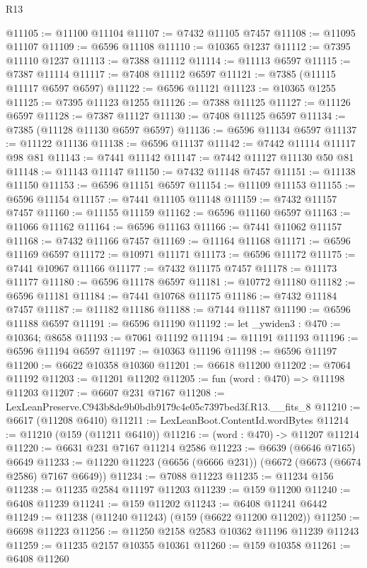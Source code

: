 \begin{lexlean}{R13}
\begin{coremodule}
@11105 := @11100 @11104
@11107 := @7432 @11105 @7457
@11108 := @11095 @11107
@11109 := @6596 @11108
@11110 := @10365 @1237
@11112 := @7395 @11110 @1237
@11113 := @7388 @11112
@11114 := @11113 @6597
@11115 := @7387 @11114
@11117 := @7408 @11112 @6597
@11121 := @7385 (@11115 @11117 @6597 @6597)
@11122 := @6596 @11121
@11123 := @10365 @1255
@11125 := @7395 @11123 @1255
@11126 := @7388 @11125
@11127 := @11126 @6597
@11128 := @7387 @11127
@11130 := @7408 @11125 @6597
@11134 := @7385 (@11128 @11130 @6597 @6597)
@11136 := @6596 @11134 @6597
@11137 := @11122 @11136
@11138 := @6596 @11137
@11142 := @7442 @11114 @11117 @98 @81
@11143 := @7441 @11142
@11147 := @7442 @11127 @11130 @50 @81
@11148 := @11143 @11147
@11150 := @7432 @11148 @7457
@11151 := @11138 @11150
@11153 := @6596 @11151 @6597
@11154 := @11109 @11153
@11155 := @6596 @11154
@11157 := @7441 @11105 @11148
@11159 := @7432 @11157 @7457
@11160 := @11155 @11159
@11162 := @6596 @11160 @6597
@11163 := @11066 @11162
@11164 := @6596 @11163
@11166 := @7441 @11062 @11157
@11168 := @7432 @11166 @7457
@11169 := @11164 @11168
@11171 := @6596 @11169 @6597
@11172 := @10971 @11171
@11173 := @6596 @11172
@11175 := @7441 @10967 @11166
@11177 := @7432 @11175 @7457
@11178 := @11173 @11177
@11180 := @6596 @11178 @6597
@11181 := @10772 @11180
@11182 := @6596 @11181
@11184 := @7441 @10768 @11175
@11186 := @7432 @11184 @7457
@11187 := @11182 @11186
@11188 := @7144 @11187
@11190 := @6596 @11188 @6597
@11191 := @6596 @11190
@11192 := let _ywiden3 : @470 := @10364; @8658
@11193 := @7061 @11192
@11194 := @11191 @11193
@11196 := @6596 @11194 @6597
@11197 := @10363 @11196
@11198 := @6596 @11197
@11200 := @6622 @10358 @10360
@11201 := @6618 @11200
@11202 := @7064 @11192
@11203 := @11201 @11202
@11205 := fun (word : @470) => @11198 @11203
@11207 := @6607 @231 @7167
@11208 := LexLeanPreserve.C943b8de9b0bdb9179c4e05c7397bed3f.R13.__fits_8
@11210 := @6617 (@11208 @6410)
@11211 := LexLeanBoot.ContentId.wordBytes
@11214 := @11210 (@159 (@11211 @6410))
@11216 := (word : @470) -> @11207 @11214
@11220 := @6631 @231 @7167 @11214 @2586
@11223 := @6639 (@6646 @7165) @6649
@11233 := @11220 @11223 (@6656 (@6666 @231)) (@6672 (@6673 (@6674 @2586) @7167 @6649))
@11234 := @7088 @11223
@11235 := @11234 @156
@11238 := @11235 @2584 @11197 @11203
@11239 := @159 @11200
@11240 := @6408 @11239
@11241 := @159 @11202
@11243 := @6408 @11241 @6442
@11249 := @11238 (@11240 @11243) (@159 (@6622 @11200 @11202))
@11250 := @6698 @11223
@11256 := @11250 @2158 @2583 @10362 @11196 @11239 @11243
@11259 := @11235 @2157 @10355 @10361
@11260 := @159 @10358
@11261 := @6408 @11260

\end{coremodule}
\end{lexlean}
